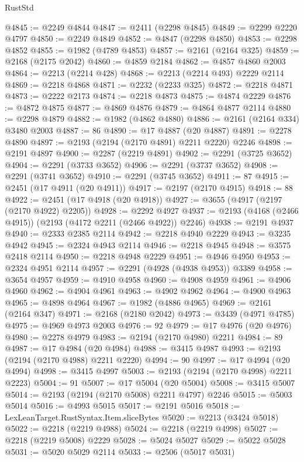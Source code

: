 \begin{lexlean}{RustStd}
\begin{coremodule}
{\begin{coremodule}
{{{{{{{{{{{{{{{{{{{{{{{{{{@4845 := @2249 @4844
@4847 := @2411 (@2298 @4845)
@4849 := @2299 @2220 @4797
@4850 := @2249 @4849
@4852 := @4847 (@2298 @4850)
@4853 := @2298 @4852
@4855 := @1982 (@4789 @4853)
@4857 := @2161 (@2164 @325)
@4859 := @2168 (@2175 @2042)
@4860 := @4859 @2184
@4862 := @4857 @4860 @2003
@4864 := @2213 (@2214 @428)
@4868 := @2213 (@2214 @493) @2229 @2114
@4869 := @2218 @4868
@4871 := @2232 (@2233 @325)
@4872 := @2218 @4871
@4873 := @2222 @2173
@4874 := @2218 @4873
@4875 := @4874 @2229
@4876 := @4872 @4875
@4877 := @4869 @4876
@4879 := @4864 @4877 @2114
@4880 := @2298 @4879
@4882 := @1982 (@4862 @4880)
@4886 := @2161 (@2164 @334) @3480 @2003
@4887 := 86
@4890 := @17 @4887 (@20 @4887)
@4891 := @2278 @4890
@4897 := @2193 (@2194 (@2170 @4891) @2211 @2220) @2246
@4898 := @2191 @4897
@4900 := @2287 (@2219 @4891)
@4902 := @2291 (@3725 @3652)
@4904 := @2291 (@3733 @3652)
@4906 := @2291 (@3737 @3652)
@4908 := @2291 (@3741 @3652)
@4910 := @2291 (@3745 @3652)
@4911 := 87
@4915 := @2451 (@17 @4911 (@20 @4911))
@4917 := @2197 (@2170 @4915)
@4918 := 88
@4922 := @2451 (@17 @4918 (@20 @4918))
@4927 := @3655 (@4917 (@2197 (@2170 @4922) @2205))
@4928 := @2292 @4927
@4937 := @2193 (@4168 (@2466 @4915)) (@2193 (@4172 @2211 (@2466 @4922)) @2246)
@4938 := @2191 @4937
@4940 := @2333 @2385 @2114
@4942 := @2218 @4940 @2229
@4943 := @3235 @4942
@4945 := @2324 @4943 @2114
@4946 := @2218 @4945
@4948 := @3575 @2418 @2114
@4950 := @2218 @4948 @2229
@4951 := @4946 @4950
@4953 := @2324 @4951 @2114
@4957 := @2291 (@4928 (@4938 @4953)) @3389
@4958 := @3654 @4957
@4959 := @4910 @4958
@4960 := @4908 @4959
@4961 := @4906 @4960
@4962 := @4904 @4961
@4963 := @4902 @4962
@4964 := @4900 @4963
@4965 := @4898 @4964
@4967 := @1982 (@4886 @4965)
@4969 := @2161 (@2164 @347)
@4971 := @2168 (@2180 @2042)
@4973 := @3439 (@4971 @4785)
@4975 := @4969 @4973 @2003
@4976 := 92
@4979 := @17 @4976 (@20 @4976)
@4980 := @2278 @4979
@4983 := @2194 (@2170 @4980) @2211
@4984 := 89
@4987 := @17 @4984 (@20 @4984)
@4988 := @3415 @4987
@4993 := @2193 (@2194 (@2170 @4988) @2211 @2220)
@4994 := 90
@4997 := @17 @4994 (@20 @4994)
@4998 := @3415 @4997
@5003 := @2193 (@2194 (@2170 @4998) @2211 @2223)
@5004 := 91
@5007 := @17 @5004 (@20 @5004)
@5008 := @3415 @5007
@5014 := @2193 (@2194 (@2170 @5008) @2211 @4797) @2246
@5015 := @5003 @5014
@5016 := @4993 @5015
@5017 := @2191 @5016
@5018 := LexLeanTarget.RustSyntax.Item.sliceBytes
@5020 := @2213 (@3424 @5018)
@5022 := @2218 (@2219 @4988)
@5024 := @2218 (@2219 @4998)
@5027 := @2218 (@2219 @5008) @2229
@5028 := @5024 @5027
@5029 := @5022 @5028
@5031 := @5020 @5029 @2114
@5033 := @2506 (@5017 @5031)
}}}}}}}}}}}}}}}}}}}}}}}}}}
\end{coremodule}}
\end{coremodule}
\end{lexlean}
